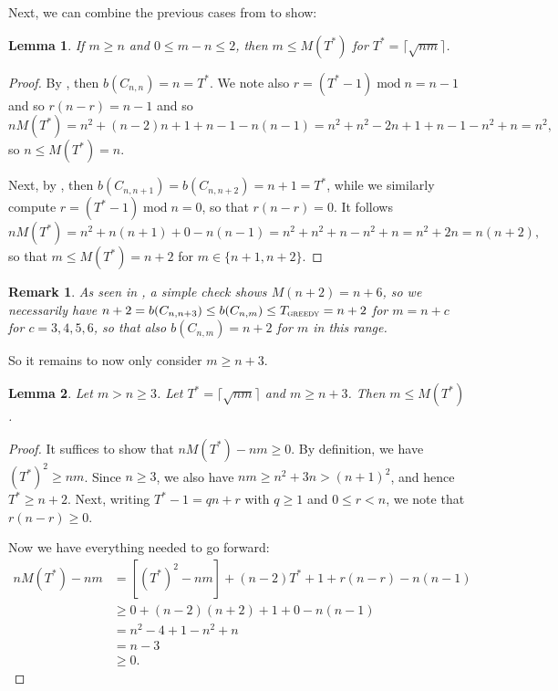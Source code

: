 \documentclass{article}
\def\pmod{\operatorname{mod}}
\newcommand{\gr}{\textsc{greedy}}
\newtheorem{lemma}{Lemma}
\newtheorem{remark}{Remark}
\begin{document}
Next, we can combine the previous cases from  to show:
\begin{lemma}\label{l: td2}
    If $m \ge n$ and $0 \le m - n \le 2$, then $m \le M(T^*)$ for $T^* = \lceil \sqrt{nm}\rceil$.
\end{lemma}

\begin{proof}
    By , then $b(C_{n,n}) = n = T^*$. We note also $r = (T^*-1)\pmod n = n-1$ and so $r(n-r) = n-1$ and so $$n M(T^*) = n^2 + (n-2)n + 1 + n-1 - n(n-1) = n^2 + n^2 - 2n + 1 + n-1-n^2 +n = n^2,$$ so $n \le M(T^*) = n$. 
    
    Next,  by , then $b(C_{n,n+1}) = b(C_{n,n+2}) = n + 1 = T^*$, while we similarly compute $r = (T^*-1)\pmod n = 0$, so that $r(n-r) = 0$. It follows
    $$nM(T^*) = n^2 + n(n+1) + 0 - n(n-1) = n^2 + n^2 + n - n^2 + n = n^2+2n = n(n+2),$$
    so that $m \le M(T^*) = n+2$ for $m \in \{n+1,n+2\}$.
\end{proof} 

\begin{remark}\label{rmk: n+2}
    As seen in , a simple check shows $M(n+2) = n + 6$, so we necessarily have $n+2 = b(C_{n,n+3}) \le b(C_{n,m}) \le T_\gr = n+2$ for $m = n + c$ for $c = 3,4,5,6$, so that also $b(C_{n,m}) = n+2$ for $m$ in this range.
\end{remark}

So it remains to now only consider $m \ge n + 3$.

\begin{lemma}\label{l: td3}
    Let $m > n \ge 3$. Let $T^* = \lceil \sqrt{nm} \rceil$ and $m \ge n+3$. Then $m \le M(T^*)$.
\end{lemma}

\begin{proof}
    It suffices to show that $nM(T^*) - nm \ge 0$. By definition, we have $(T^*)^2 \ge nm$. Since $n \ge 3$, we also have $nm \ge n^2 + 3n > (n+1)^2$, and hence $T^* \ge n+2$. Next, writing $T^*-1 = qn + r$ with $q \ge 1$ and $0 \le r < n$, we note that $r(n-r) \ge 0$.

    Now we have everything needed to go forward: 
    \begin{align*}
        nM(T^*) - nm &= [(T^*)^2 - nm]+ (n-2)T^* + 1 + r(n-r) - n(n-1)\\
        &\ge 0 + (n-2)(n+2) + 1 + 0- n(n-1)\\
        &= n^2-4 + 1-n^2+n\\
        &=n-3\\
        &\ge 0.
    \end{align*}
\end{proof}
\end{document}
